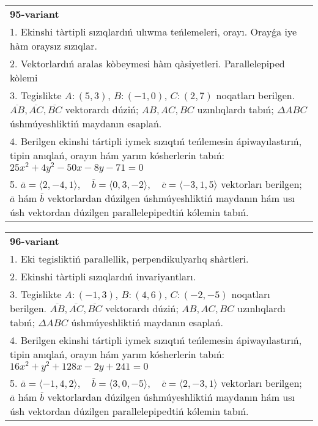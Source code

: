 \documentclass{article}
\begin{document}
\begin{tabular}{m{17cm}}
\textbf{95-variant}\\
1. Ekinshi tàrtipli sızıqlardıń ulıwma teńlemeleri, orayı. Orayǵa iye hàm oraysız sızıqlar.\\

2. Vektorlardıń aralas kòbeymesi hàm qàsiyetleri. Parallelepiped kòlemi\\

3. Tegislikte $A: (5, 3)$, $B: (-1, 0)$, $C: (2, 7)$ noqatları berilgen. $\overline{AB}, \overline{AC}, \overline{BC}$ vektorardı dúziń; $AB, AC, BC$ uzınlıqlardı tabıń; $\Delta ABC$ úshmúyeshliktiń maydanın esaplań. \\

4. Berilgen ekinshi tártipli iymek sızıqtıń teńlemesin ápiwayılastırıń, tipin anıqlań, orayın hám yarım kósherlerin tabıń: $25x^2+4y^2-50x-8y-71=0$\\

5. \(\overline{a} = \langle 2, -4, 1 \rangle, \quad \overline{b} = \langle 0, 3, -2 \rangle, \quad \overline{c} = \langle -3, 1, 5 \rangle\) vektorları berilgen; \(\overline{a}\) hám \(\overline{b}\) vektorlardan dúzilgen úshmúyeshliktiń maydanın hám usı úsh vektordan dúzilgen parallelepipedtiń kólemin tabıń.
\end{tabular}
\vspace{1cm}


\begin{tabular}{m{17cm}}
\textbf{96-variant}\\
1. Eki tegisliktiń parallellik, perpendikulyarlıq shàrtleri.\\

2. Ekinshi tàrtipli sızıqlardıń invariyantları.\\

3. Tegislikte $A: (-1, 3)$, $B: (4, 6)$, $C: (-2, -5)$ noqatları berilgen. $\overline{AB}, \overline{AC}, \overline{BC}$ vektorardı dúziń; $AB, AC, BC$ uzınlıqlardı tabıń; $\Delta ABC$ úshmúyeshliktiń maydanın esaplań. \\

4. Berilgen ekinshi tártipli iymek sızıqtıń teńlemesin ápiwayılastırıń, tipin anıqlań, orayın hám yarım kósherlerin tabıń: $16x^2+y^2+128x-2y+241=0$\\

5. \(\overline{a} = \langle -1, 4, 2 \rangle, \quad \overline{b} = \langle 3, 0, -5 \rangle, \quad \overline{c} = \langle 2, -3, 1 \rangle\) vektorları berilgen; \(\overline{a}\) hám \(\overline{b}\) vektorlardan dúzilgen úshmúyeshliktiń maydanın hám usı úsh vektordan dúzilgen parallelepipedtiń kólemin tabıń.
\end{tabular}
\vspace{1cm}
\end{document}
